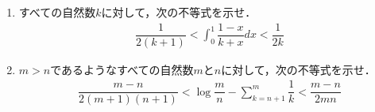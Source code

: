 \documentclass[../../main.tex]{subfiles}
\begin{document}
\begin{enumerate}
  \item すべての自然数$k$に対して，次の不等式を示せ．
    \begin{align*}
      \dfrac{1}{2(k+1)}<\int_0^1\dfrac{1-x}{k+x}dx<\dfrac{1}{2k}
    \end{align*}
  \item $m>n$であるようなすべての自然数$m$と$n$に対して，次の不等式を示せ．
    \begin{align*}
      \dfrac{m-n}{2(m+1)(n+1)}<\log\dfrac{m}{n}-\sum_{k=n+1}^m\dfrac{1}{k}<\dfrac{m-n}{2mn}
    \end{align*}
\end{enumerate}
\end{document}
